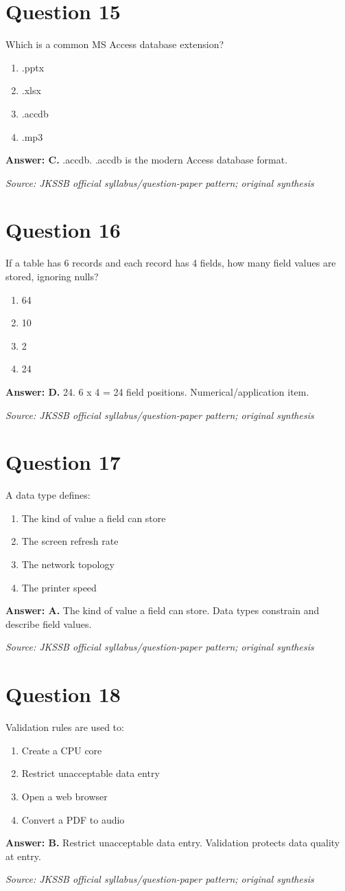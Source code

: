 \documentclass[11pt,a4paper]{book}
\newcommand{\source}[1]{\par\smallskip\textit{Source: #1}}
\newcommand{\answer}[2]{\par\textbf{Answer: #1.} #2}
\begin{document}
\section*{Question 15}
Which is a common MS Access database extension?
\begin{enumerate}[label=\Alph*.]
\item .pptx
\item .xlsx
\item .accdb
\item .mp3
\end{enumerate}
\answer{C}{.accdb. .accdb is the modern Access database format.}
\source{JKSSB official syllabus/question-paper pattern; original synthesis}
\section*{Question 16}
If a table has 6 records and each record has 4 fields, how many field values are stored, ignoring nulls?
\begin{enumerate}[label=\Alph*.]
\item 64
\item 10
\item 2
\item 24
\end{enumerate}
\answer{D}{24. 6 x 4 = 24 field positions. Numerical/application item.}
\source{JKSSB official syllabus/question-paper pattern; original synthesis}
\section*{Question 17}
A data type defines:
\begin{enumerate}[label=\Alph*.]
\item The kind of value a field can store
\item The screen refresh rate
\item The network topology
\item The printer speed
\end{enumerate}
\answer{A}{The kind of value a field can store. Data types constrain and describe field values.}
\source{JKSSB official syllabus/question-paper pattern; original synthesis}
\section*{Question 18}
Validation rules are used to:
\begin{enumerate}[label=\Alph*.]
\item Create a CPU core
\item Restrict unacceptable data entry
\item Open a web browser
\item Convert a PDF to audio
\end{enumerate}
\answer{B}{Restrict unacceptable data entry. Validation protects data quality at entry.}
\source{JKSSB official syllabus/question-paper pattern; original synthesis}
\end{document}
